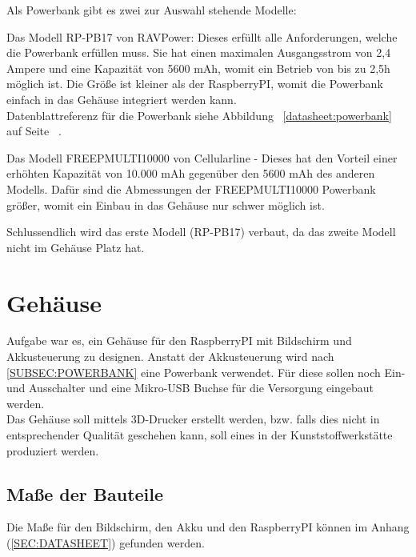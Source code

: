\documentclass[12pt,a4paper]{article}
\begin{document}
Als Powerbank gibt es zwei zur Auswahl stehende Modelle:
\begin{itemize}
	\item{Das Modell RP-PB17 von RAVPower: Dieses erfüllt alle Anforderungen, welche die Powerbank erfüllen muss. Sie hat einen maximalen Ausgangsstrom von 2,4 Ampere und eine Kapazität von 5600 mAh, womit ein Betrieb von bis zu 2,5h möglich ist. Die Größe ist kleiner als der RaspberryPI, womit die Powerbank einfach in das Gehäuse integriert werden kann. \\
Datenblattreferenz für die Powerbank siehe Abbildung ~\ref{datasheet:powerbank} auf Seite ~\pageref{datasheet:powerbank}.
	\item{Das Modell FREEPMULTI10000 von Cellularline - Dieses hat den Vorteil einer erhöhten Kapazität von 10.000 mAh gegenüber den 5600 mAh des anderen Modells. Dafür sind die Abmessungen der FREEPMULTI10000 Powerbank größer, womit ein Einbau in das Gehäuse nur schwer möglich ist.}
}
\end{itemize}
Schlussendlich wird das erste Modell (RP-PB17) verbaut, da das zweite Modell nicht im Gehäuse Platz hat.

\clearpage\vfill\newpage{}
\section{Gehäuse}
\label{SEC:case}

Aufgabe war es, ein Gehäuse für den RaspberryPI mit Bildschirm und Akkusteuerung zu designen. Anstatt der Akkusteuerung wird nach \ref{SUBSEC:POWERBANK} eine Powerbank verwendet. Für diese sollen noch Ein- und Ausschalter und eine Mikro-USB Buchse für die Versorgung eingebaut werden. \\
Das Gehäuse soll mittels 3D-Drucker erstellt werden, bzw. falls dies nicht in entsprechender Qualität geschehen kann, soll eines in der Kunststoffwerkstätte produziert werden.\\

\subsection{Maße der Bauteile}

Die Maße für den Bildschirm, den Akku und den RaspberryPI können im Anhang  (\ref{SEC:DATASHEET}) gefunden werden.
\end{document}
